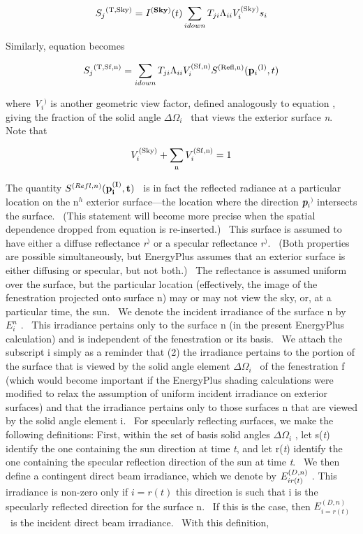 \begin{equation}
{S_j}^{{\rm{(T,Sky)}}} = {I^{({\bf{Sky}})}}(t)\sum\limits_{i{\rm{ }}down} {{T_{ji}}{\Lambda_{ii}}V_i^{{\rm{(Sky)}}}{s_i}}
\end{equation}

Similarly, equation becomes

\begin{equation}
{S_j}^{{\rm{(T, Sf, n)}}} = \sum\limits_{i{\rm{ }}down} {{T_{ji}}{\Lambda_{ii}}V_i^{{\rm{(Sf, n)}}}{S^{{\rm{(Refl, n)}}}}({{\bf{p}}_i}^{{\rm{(I)}}},t)}
\end{equation}

where \emph{V\(_{i}\)}\(^{)}\) is another geometric view factor, defined analogously to equation , giving the fraction of the solid angle \(\Delta {\Omega_i}\) ~that views the exterior surface \emph{n}.~ Note that

\begin{equation}
V_i^{{\rm{(Sky)}}} + \sum\limits_{\rm{n}} {V_i^{{\rm{(Sf, n)}}}}  = 1
\end{equation}

The quantity \(S^{(Refl,n)} (\bf{p}_i^{(I)},t)\) ~is in fact the reflected radiance at a particular location on the n\(^{h}\) exterior surface---the location where the direction \textbf{\emph{p}}\emph{\(_{i}\)}\(^{)}\) intersects the surface.~ (This statement will become more precise when the spatial dependence dropped from equation is re-inserted.)~ This surface is assumed to have either a diffuse reflectance \emph{r}\(^{)}\) or a specular reflectance \emph{r}\(^{)}\).~ (Both properties are possible simultaneously, but EnergyPlus assumes that an exterior surface is either diffusing or specular, but not both.)~ The reflectance is assumed uniform over the surface, but the particular location (effectively, the image of the fenestration projected onto surface n) may or may not view the sky, or, at a particular time, the sun.~ We denote the incident irradiance of the surface n by \(E_i^n\) .~ This irradiance pertains only to the surface n (in the present EnergyPlus calculation) and is independent of the fenestration or its basis.~ We attach the subscript i simply as a reminder that (2) the irradiance pertains to the portion of the surface that is viewed by the solid angle element \(\Delta {\Omega_i}\) ~of the fenestration f (which would become important if the EnergyPlus shading calculations were modified to relax the assumption of uniform incident irradiance on exterior surfaces) and that the irradiance pertains only to those surfaces n that are viewed by the solid angle element i.~ For specularly reflecting surfaces, we make the following definitions: First, within the set of basis solid angles \(\Delta {\Omega_i}\) , let s(\emph{t}) identify the one containing the sun direction at time \emph{t}, and let r(\emph{t}) identify the one containing the specular reflection direction of the sun at time \emph{t}.~ We then define a contingent direct beam irradiance, which we denote by \(E_{i{\rm{ }}r(t)}^{(D,n)}\) . This irradiance is non-zero only if \(i = r(t)\) this direction is such that i is the specularly reflected direction for the surface n.~ If this is the case, then \(E_{i = r(t)}^{(D,n)}\) ~is the incident direct beam irradiance.~ With this definition,

